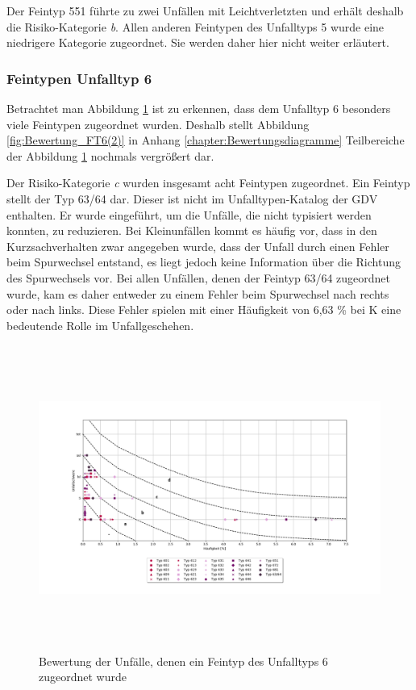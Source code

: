 Der Feintyp 551 führte zu zwei Unfällen mit Leichtverletzten und erhält deshalb die Risiko-Kategorie \textit{b}. Allen anderen Feintypen des Unfalltyps 5 wurde eine niedrigere Kategorie zugeordnet. Sie werden daher hier nicht weiter erläutert.

\subsubsection{Feintypen Unfalltyp 6}
Betrachtet man Abbildung \ref{fig:Bewertung_FT6} ist zu erkennen, dass dem Unfalltyp 6 besonders viele Feintypen zugeordnet wurden. Deshalb stellt Abbildung \ref{fig:Bewertung_FT6(2)} in Anhang \ref{chapter:Bewertungsdiagramme} Teilbereiche der Abbildung \ref{fig:Bewertung_FT6} nochmals vergrößert dar.

Der Risiko-Kategorie \textit{c} wurden insgesamt acht Feintypen zugeordnet. Ein Feintyp stellt der Typ 63/64 dar. Dieser ist nicht im Unfalltypen-Katalog der GDV enthalten. Er wurde eingeführt, um die Unfälle, die nicht typisiert werden konnten, zu reduzieren. Bei Kleinunfällen kommt es häufig vor, dass in den Kurzsachverhalten zwar angegeben wurde, dass der Unfall durch einen Fehler beim Spurwechsel entstand, es liegt jedoch keine Information über die Richtung des Spurwechsels vor. Bei allen Unfällen, denen der Feintyp 63/64 zugeordnet wurde, kam es daher entweder zu einem Fehler beim Spurwechsel nach rechts oder nach links. Diese Fehler spielen mit einer Häufigkeit von 6,63 \% bei \ac{K} eine bedeutende Rolle im Unfallgeschehen.

\begin{savenotes}
	\begin{figure}[H]
		\centering
		\includegraphics[width=18cm,height=10cm]{figures/Bewertung_FT6}
		\caption[Bewertung der Unfälle, denen ein Feintyp des Unfalltyps 6 zugeordnet wurde]{Bewertung der Unfälle, denen ein Feintyp des Unfalltyps 6 zugeordnet wurde}\label{fig:Bewertung_FT6}
	\end{figure}
\end{savenotes}

